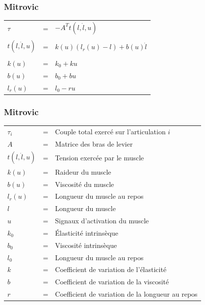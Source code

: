 \documentclass{beamer}
\begin{document}
\begin{frame}
\frametitle{Mitrovic}
\begin{tabular}{lcl}
    $\tau$ & = & $-A^T t(l, \dot{l}, u)$ \\
    \\
    $t(l, \dot{l}, u)$        & = & $k(u) (l_r(u) - l) + b(u) \dot{l}$ \\
    \\
    $k(u)$    & = & $k_0 + k u$ \\
    $b(u)$    & = & $b_0 + b u$ \\
    $l_r(u)$  & = & $l_0 - r u$ \\
\end{tabular}
\end{frame}

\begin{frame}
\frametitle{Mitrovic}
\begin{tabular}{lcl}
    $\tau_i$ & = & Couple total exercé sur l'articulation $i$ \\
    $A$  & = & Matrice des bras de levier \\
    $t(l, \dot{l}, u)$  & = & Tension exercée par le muscle \\
    $k(u)$ & = & Raideur du muscle \\
    $b(u)$ & = & Viscosité du muscle \\
    $l_r(u)$ & = & Longueur du muscle au repos \\
    $l$ & = & Longueur du muscle \\
    $u$ & = & Signaux d'activation du muscle \\
    $k_0$ & = & Élasticité intrinsèque \\
    $b_0$ & = & Viscosité intrinsèque \\
    $l_0$ & = & Longueur du muscle au repos \\
    $k$ & = & Coefficient de variation de l'élasticité \\
    $b$ & = & Coefficient de variation de la viscosité \\
    $r$ & = & Coefficient de variation de la longueur au repos \\
\end{tabular}
\end{frame}
\end{document}
